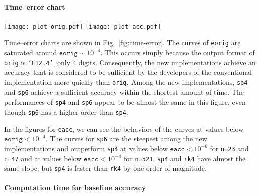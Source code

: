 \documentclass[preprint, 5p, times, sort&compress]{elsarticle}
\begin{document}
        \paragraph{Time--error chart}
        \begin{figure*}[t]
                \centering
                \texttt{[image: plot-orig.pdf]}
                \texttt{[image: plot-acc.pdf]}
                \caption{Time--error charts for the conventional and proposed implementations.
                        The top figures are for \texttt{eorig}, and the bottom figures are for \texttt{eacc}.
                        All measurements were performed five times, and log-log-plotted as markers.
                        The lines are the medians for each \texttt{dz}.
                        We placed the results for \texttt{orig} on the x-axis in the top figures
                        to indicate that the \texttt{eorig} value is exactly $0$ by definition.}
                \label{fig:time-error}
        \end{figure*}
        Time--error charts are shown in Fig.~\ref{fig:time-error}.
        The curves of \texttt{eorig} are saturated around $\mathtt{eorig} \sim 10^{-4}$.
        This occurs simply because the output format of \texttt{orig} is \texttt{'E12.4'}, only $4$ digits.
        Consequently, the new implementations achieve an accuracy that is considered to be sufficient by the developers of the conventional implementation more quickly than \texttt{orig}.
        Among the new implementations, \texttt{sp4} and \texttt{sp6} achieve a sufficient accuracy within the shortest amount of time.
        The performances of \texttt{sp4} and \texttt{sp6} appear to be almost the same in this figure,  even though \texttt{sp6} has a higher order than \texttt{sp4}.

        In the figures for \texttt{eacc}, we can see the behaviors of the curves at values below $\mathtt{eorig} < 10^{-4}$.
        The curves for \texttt{sp6} are the steepest among the new implementations
        and outperform \texttt{sp4} at values below $\mathtt{eacc}<10^{-6}$ for \texttt{n=23} and \texttt{n=47}
        and at values below $\mathtt{eacc}<10^{-4}$ for \texttt{n=521}.
        \texttt{sp4} and \texttt{rk4} have almost the same slope, but \texttt{sp4} is faster than \texttt{rk4} by one order of magnitude.


        \paragraph{Computation time for baseline accuracy}
        \begin{table*}
                \centering
                \caption{Computation time and speed-up rate from \texttt{orig}.
                        We selected the fastest results such that the $\mathtt{eacc}$ value
                        is smaller than that of \texttt{orig}.}\label{tab:times}
                
        \end{table*}
\end{document}
